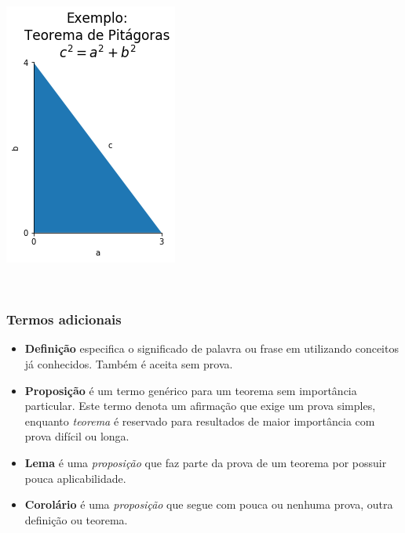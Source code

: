     \begin{center}
	    \includegraphics[scale=.6]{img/pitagoras.png}
    \end{center}
    { \hspace*{\fill} \\}
    
    \hypertarget{termos-adicionais}{%
\subsubsection{Termos adicionais}\label{termos-adicionais}}

\begin{itemize}
\item
  \textbf{Definição} especifica o significado de palavra ou frase em
  utilizando conceitos já conhecidos. Também é aceita sem prova.
\item
  \textbf{Proposição} é um termo genérico para um teorema sem
  importância particular. Este termo denota um afirmação que exige um
  prova simples, enquanto \emph{teorema} é reservado para resultados de
  maior importância com prova difícil ou longa.
\item
  \textbf{Lema} é uma \emph{proposição} que faz parte da prova de um
  teorema por possuir pouca aplicabilidade.
\item
  \textbf{Corolário} é uma \emph{proposição} que segue com pouca ou
  nenhuma prova, outra definição ou teorema.
\end{itemize}

